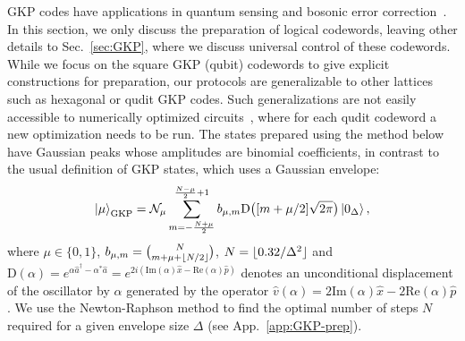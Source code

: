 \documentclass[aps,prx,showpacs,notitlepage,twocolumn,superscriptaddress,nofootinbib,preprintnumbers,floatfix,10pt, longbibliography]{revtex4-2}
\DeclarePairedDelimiter\floor{\lfloor}{\rfloor}
\begin{document}
GKP codes have applications in quantum sensing and bosonic error correction~\cite{sivak2023real,campagne2020quantum,fluhmann2019encoding,brady2024advances}. In this section, we only discuss the preparation of logical codewords, leaving other details to Sec.~\ref{sec:GKP}, where we discuss universal control of these codewords. While we focus on the square GKP (qubit) codewords to give explicit constructions for preparation, our protocols are generalizable to other lattices such as hexagonal or qudit GKP codes. Such generalizations are not easily accessible to numerically optimized circuits~\cite{eickbusch2022fast}, where for each qudit codeword a new optimization needs to be run. The states prepared using the method below have Gaussian peaks whose amplitudes are binomial coefficients, in contrast to the usual definition of GKP states, which uses a Gaussian envelope:
\begin{align}
  \ket{\mu}_\mathrm{GKP}=\mathcal{N}_\mu \sum_{m=-\frac{N+\mu}{2}}^{\frac{N-\mu}{2}+1} b_{\mu,m}\mathrm{D}\big([m+\mu/2]\sqrt{2\pi}\big)\ket{0_\Delta},\label{eq:GKP-bin-logical}
\end{align}
where $\mu \in \{0,1\}$, $b_{\mu,m}={N\choose m+\mu+\floor{N/2}}$, $N=\floor{0.32/\Delta^2}$
and $\mathrm{D}(\alpha)=e^{\alpha \hat a^\dagger-\alpha^*\hat a}=e^{2i(\mathrm{Im}(\alpha)\hat x-\mathrm{Re}(\alpha)\hat p)}$ denotes an unconditional displacement of the oscillator by $\alpha$ generated by the operator $\hat v(\alpha)=2\mathrm{Im}(\alpha)\hat x-2\mathrm{Re}(\alpha)\hat p$. We use the Newton-Raphson method to find the optimal number of steps $N$ required for a given envelope size $\Delta$ (see App.~\ref{app:GKP-prep}).


\end{document}
